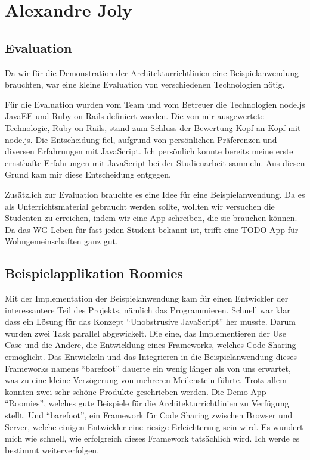 \section{Alexandre Joly}





\subsection*{Evaluation}
Da wir für die Demonstration der Architekturrichtlinien eine Beispielanwendung brauchten, war eine kleine Evaluation von verschiedenen Technologien nötig.

Für die Evaluation wurden vom Team und vom Betreuer die Technologien node.js JavaEE und Ruby on Rails definiert worden. Die von mir ausgewertete Technologie, Ruby on Rails, stand zum Schluss der Bewertung Kopf an Kopf mit node.js. Die Entscheidung fiel, aufgrund von persönlichen Präferenzen und diversen Erfahrungen mit JavaScript. Ich persönlich konnte bereits meine erste ernsthafte Erfahrungen mit JavaScript bei der Studienarbeit sammeln. Aus diesen Grund kam mir diese Entscheidung entgegen.

Zusätzlich zur Evaluation brauchte es eine Idee für eine Beispielanwendung. Da es als Unterrichtsmaterial gebraucht werden sollte, wollten wir versuchen die Studenten zu erreichen, indem wir eine App schreiben, die sie brauchen können. Da das WG-Leben für fast jeden Student bekannt ist, trifft eine TODO-App für Wohngemeinschaften ganz gut.

\subsection*{Beispielapplikation Roomies}
Mit der Implementation der Beispielanwendung kam für einen Entwickler der interessantere Teil des Projekts, nämlich das Programmieren.
Schnell war klar dass ein Lösung für das Konzept ``Unobstrusive JavaScript'' her musste. Darum wurden zwei Task parallel abgewickelt. Die eine, das Implementieren der Use Case und die Andere, die Entwicklung eines Frameworks, welches Code Sharing ermöglicht. Das Entwickeln und das Integrieren in die Beispielanwendung dieses Frameworks namens ``barefoot'' dauerte ein wenig länger als von uns erwartet, was zu eine kleine Verzögerung von mehreren Meilenstein führte. Trotz allem konnten zwei sehr schöne Produkte geschrieben werden. Die Demo-App ``Roomies'', welches gute Beispiele für die Architekturrichtlinien zu Verfügung stellt. Und ``barefoot'', ein Framework für Code Sharing zwischen Browser und Server, welche einigen Entwickler eine riesige Erleichterung sein wird. Es wundert mich wie schnell, wie erfolgreich dieses Framework tatsächlich wird. Ich werde es bestimmt weiterverfolgen.


